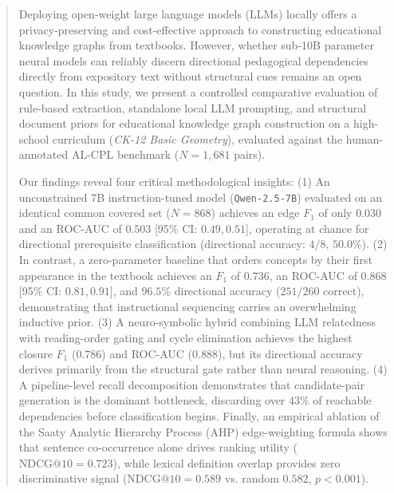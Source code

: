 \begin{abstract}
Deploying open-weight large language models (LLMs) locally offers a privacy-preserving and cost-effective approach to constructing educational knowledge graphs from textbooks. However, whether sub-10B parameter neural models can reliably discern directional pedagogical dependencies directly from expository text without structural cues remains an open question. In this study, we present a controlled comparative evaluation of rule-based extraction, standalone local LLM prompting, and structural document priors for educational knowledge graph construction on a high-school curriculum (\textit{CK-12 Basic Geometry}), evaluated against the human-annotated AL-CPL benchmark ($N=1{,}681$ pairs). 

Our findings reveal four critical methodological insights:
(1) An unconstrained 7B instruction-tuned model (\texttt{Qwen-2.5-7B}) evaluated on an identical common covered set ($N=868$) achieves an edge $F_1$ of only $0.030$ and an ROC-AUC of $0.503$ [95\% CI: $0.49, 0.51$], operating at chance for directional prerequisite classification (directional accuracy: $4/8$, $50.0\%$).
(2) In contrast, a zero-parameter baseline that orders concepts by their first appearance in the textbook achieves an $F_1$ of $0.736$, an ROC-AUC of $0.868$ [95\% CI: $0.81, 0.91$], and $96.5\%$ directional accuracy ($251/260$ correct), demonstrating that instructional sequencing carries an overwhelming inductive prior.
(3) A neuro-symbolic hybrid combining LLM relatedness with reading-order gating and cycle elimination achieves the highest closure $F_1$ ($0.786$) and ROC-AUC ($0.888$), but its directional accuracy derives primarily from the structural gate rather than neural reasoning.
(4) A pipeline-level recall decomposition demonstrates that candidate-pair generation is the dominant bottleneck, discarding over $43\%$ of reachable dependencies before classification begins. 
Finally, an empirical ablation of the Saaty Analytic Hierarchy Process (AHP) edge-weighting formula shows that sentence co-occurrence alone drives ranking utility ($\text{NDCG@10} = 0.723$), while lexical definition overlap provides zero discriminative signal ($\text{NDCG@10} = 0.589$ vs. random $0.582$, $p < 0.001$).
\end{abstract}
